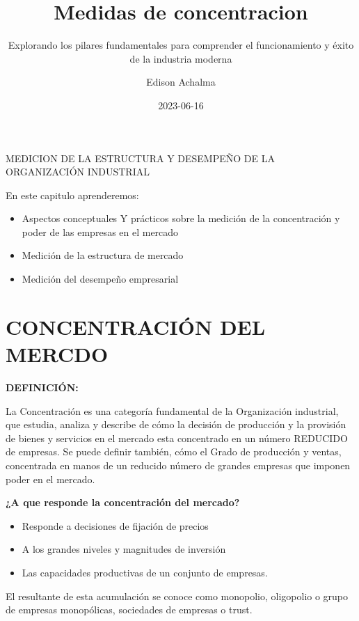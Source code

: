 \documentclass[
  letterpaper,
  DIV=11,
  numbers=noendperiod]{scrartcl}
\title{Medidas de concentracion}
\subtitle{Explorando los pilares fundamentales para comprender el
funcionamiento y éxito de la industria moderna}
\author{Edison Achalma}
\date{2023-06-16}
\begin{document}
\maketitle
\ifdefined\Shaded\renewenvironment{Shaded}{\begin{tcolorbox}[frame hidden, boxrule=0pt, breakable, borderline west={3pt}{0pt}{shadecolor}, interior hidden, enhanced, sharp corners]}{\end{tcolorbox}}\fi

MEDICION DE LA ESTRUCTURA Y DESEMPEÑO DE LA ORGANIZACIÓN INDUSTRIAL

En este capitulo aprenderemos:

\begin{itemize}
\item
  Aspectos conceptuales Y prácticos sobre la medición de la
  concentración y poder de las empresas en el mercado
\item
  Medición de la estructura de mercado
\item
  Medición del desempeño empresarial
\end{itemize}

\hypertarget{concentraciuxf3n-del-mercdo}{%
\section{CONCENTRACIÓN DEL MERCDO}\label{concentraciuxf3n-del-mercdo}}

\textbf{DEFINICIÓN:}

La Concentración es una categoría fundamental de la Organización
industrial, que estudia, analiza y describe de cómo la decisión de
producción y la provisión de bienes y servicios en el mercado esta
concentrado en un número REDUCIDO de empresas. Se puede definir también,
cómo el Grado de producción y ventas, concentrada en manos de un
reducido número de grandes empresas que imponen poder en el mercado.

\textbf{¿A que responde la concentración del mercado?}

\begin{itemize}
\item
  Responde a decisiones de fijación de precios
\item
  A los grandes niveles y magnitudes de inversión
\item
  Las capacidades productivas de un conjunto de empresas.
\end{itemize}

El resultante de esta acumulación se conoce como monopolio, oligopolio o
grupo de empresas monopólicas, sociedades de empresas o trust.
\end{document}
